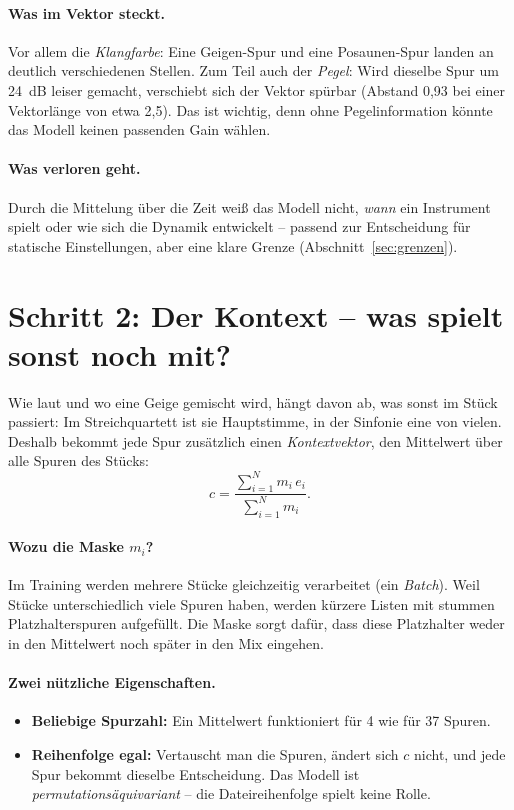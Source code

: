 \documentclass[11pt,a4paper]{article}
\begin{document}
\paragraph{Was im Vektor steckt.} Vor allem die \emph{Klangfarbe}: Eine
Geigen-Spur und eine Posaunen-Spur landen an deutlich verschiedenen Stellen.
Zum Teil auch der \emph{Pegel}: Wird dieselbe Spur um \SI{24}{dB} leiser
gemacht, verschiebt sich der Vektor spürbar (Abstand 0,93 bei einer
Vektorlänge von etwa 2,5). Das ist wichtig, denn ohne Pegelinformation könnte
das Modell keinen passenden Gain wählen.

\paragraph{Was verloren geht.} Durch die Mittelung über die Zeit weiß das
Modell nicht, \emph{wann} ein Instrument spielt oder wie sich die Dynamik
entwickelt -- passend zur Entscheidung für statische Einstellungen, aber eine
klare Grenze (Abschnitt~\ref{sec:grenzen}).

\section{Schritt 2: Der Kontext -- was spielt sonst noch mit?}

Wie laut und wo eine Geige gemischt wird, hängt davon ab, was sonst im Stück
passiert: Im Streichquartett ist sie Hauptstimme, in der Sinfonie eine von
vielen. Deshalb bekommt jede Spur zusätzlich einen \emph{Kontextvektor}, den
Mittelwert über alle Spuren des Stücks:
\begin{equation}
  c = \frac{\sum_{i=1}^{N} m_i\, e_i}{\sum_{i=1}^{N} m_i}.
  \label{eq:ctx}
\end{equation}

\paragraph{Wozu die Maske $m_i$?} Im Training werden mehrere Stücke
gleichzeitig verarbeitet (ein \emph{Batch}). Weil Stücke unterschiedlich viele
Spuren haben, werden kürzere Listen mit stummen Platzhalterspuren aufgefüllt.
Die Maske sorgt dafür, dass diese Platzhalter weder in den Mittelwert noch
später in den Mix eingehen.

\paragraph{Zwei nützliche Eigenschaften.}
\begin{itemize}[nosep]
  \item \textbf{Beliebige Spurzahl:} Ein Mittelwert funktioniert für 4 wie für
    37 Spuren.
  \item \textbf{Reihenfolge egal:} Vertauscht man die Spuren, ändert sich $c$
    nicht, und jede Spur bekommt dieselbe Entscheidung. Das Modell ist
    \emph{permutationsäquivariant} -- die Dateireihenfolge spielt keine Rolle.
\end{itemize}
\end{document}
